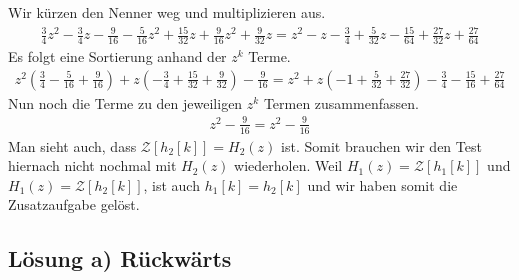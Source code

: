 \documentclass[11pt,a4paper,DIV=12]{scrartcl}
\begin{document}
Wir kürzen den Nenner weg und multiplizieren aus.
\begin{gather}
	\frac{3}{4}z^2-\frac{3}{4}z-\frac{9}{16}-\frac{5}{16}z^2+\frac{15}{32}z+\frac{9}{16}z^2+\frac{9}{32}z=z^2-z-\frac{3}{4}+\frac{5}{32}z-\frac{15}{64}+\frac{27}{32}z+\frac{27}{64}
\end{gather}
Es folgt eine Sortierung anhand der $z^k$ Terme.
\begin{gather}
	z^2(\frac{3}{4}-\frac{5}{16}+\frac{9}{16})+z(-\frac{3}{4}+\frac{15}{32}+\frac{9}{32})-\frac{9}{16}=z^2+z(-1+\frac{5}{32}+\frac{27}{32})-\frac{3}{4}-\frac{15}{16}+\frac{27}{64}
\end{gather}
Nun noch die Terme zu den jeweiligen $z^k$ Termen zusammenfassen.
\begin{gather}
	z^2-\frac{9}{16}=z^2-\frac{9}{16}
\end{gather}
Man sieht auch, dass $\mathcal{Z}\left[h_2[k]\right]=H_2(z)$ ist. Somit brauchen wir den Test hiernach nicht nochmal mit $H_2(z)$ wiederholen. Weil $H_1(z)=\mathcal{Z}\left[h_1[k]\right]$ und $H_1(z)=\mathcal{Z}\left[h_2[k]\right]$, ist auch $h_1[k]=h_2[k]$ und wir haben somit die Zusatzaufgabe gelöst.\\
\newpage
\subsection*{Lösung a) Rückwärts}
\end{document}
